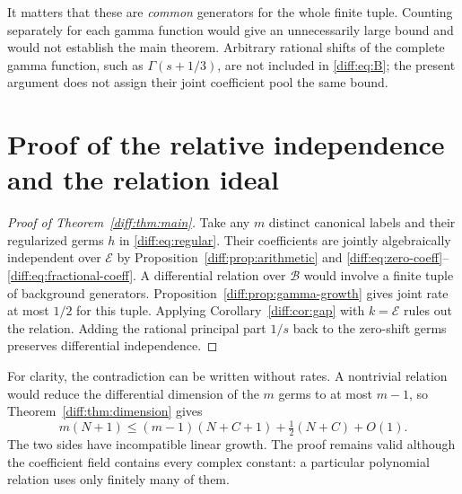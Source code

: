 \documentclass[11pt,a4paper]{article}
\newcommand{\E}{\mathcal E}
\newcommand{\B}{\mathscr B}
\theoremstyle{definition}
\theoremstyle{remark}
\numberwithin{equation}{section}
\begin{document}
It matters that these are \emph{common} generators for the whole
finite tuple. Counting separately for each gamma function would give
an unnecessarily large bound and would not establish the main theorem.
Arbitrary rational shifts of the complete gamma function, such as
$\Gamma(s+1/3)$, are not included in \eqref{diff:eq:B}; the present
argument does not assign their joint coefficient pool the same bound.

\section{Proof of the relative independence and the relation ideal}

\begin{proof}[Proof of Theorem~\ref{diff:thm:main}]
Take any $m$ distinct canonical labels and their regularized germs
$h$ in \eqref{diff:eq:regular}. Their coefficients are jointly
algebraically independent over $\E$ by
Proposition~\ref{diff:prop:arithmetic} and
\eqref{diff:eq:zero-coeff}--\eqref{diff:eq:fractional-coeff}.
A differential relation over $\B$ would involve a finite tuple
of background generators. Proposition~\ref{diff:prop:gamma-growth}
gives joint rate at most $1/2$ for this tuple. Applying
Corollary~\ref{diff:cor:gap} with $k=\E$ rules out the relation.
Adding the rational principal part $1/s$ back to the zero-shift
germs preserves differential independence.
\end{proof}

For clarity, the contradiction can be written without rates. A
nontrivial relation would reduce the differential dimension of the
$m$ germs to at most $m-1$, so Theorem~\ref{diff:thm:dimension} gives
\[
 m(N+1)\le (m-1)(N+C+1)+\tfrac12(N+C)+O(1).
\]
The two sides have incompatible linear growth. The proof remains
valid although the coefficient field contains every complex constant:
a particular polynomial relation uses only finitely many of them.
\end{document}
